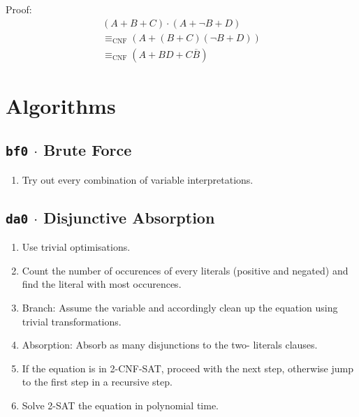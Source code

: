 \documentclass[12pt, letterpaper]{article}
\begin{document}
\begin{description}
        Proof: \begin{equation}\nonumber\begin{split}
            (A + B + C) \cdot (A + \lnot B + D) \\
            \equiv_\text{CNF} (A + (B + C)(\lnot B + D)) \\
            \equiv_\text{CNF} (A + BD + C \overline B)
        \end{split}\end{equation}

    \end{description}

    \section*{Algorithms}

    \subsection*{\texttt{bf0} $\cdot$ Brute Force}

    \begin{enumerate}
        \item Try out every combination of variable interpretations.
    \end{enumerate}

    \subsection*{\texttt{da0} $\cdot$ Disjunctive Absorption}

    \begin{enumerate}
        \item Use trivial optimisations.

        \item Count the number of occurences of every literals
        (positive and negated) and find the literal with most
        occurences.

        \item Branch: Assume the variable and accordingly clean
        up the equation using trivial transformations.

        \item Absorption: Absorb as many disjunctions to the two-
        literals clauses.

        \item If the equation is in 2-CNF-SAT, proceed with the
        next step, otherwise jump to the first step in a recursive
        step.

        \item Solve 2-SAT the equation in polynomial time.
    \end{enumerate}
\end{document}
